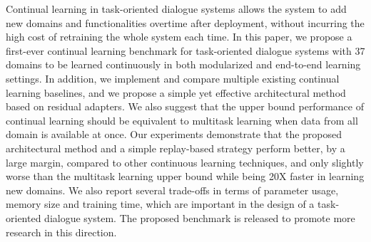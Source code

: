 Continual learning in task-oriented dialogue systems allows the system to add new domains and functionalities overtime after deployment, without incurring the high cost of retraining the whole system each time. In this paper, we propose a first-ever continual learning benchmark for task-oriented dialogue systems with 37 domains to be learned continuously in both modularized and end-to-end learning settings.  In addition, we implement and compare multiple existing continual learning baselines, and we propose a simple yet effective architectural method based on residual adapters. We also suggest that the upper bound performance of continual learning should be equivalent to multitask learning when data from all domain is available at once. Our experiments demonstrate that the proposed architectural method and a simple replay-based strategy perform better, by a large margin, compared to other continuous learning techniques, and only slightly worse than the multitask learning upper bound while being 20X faster in learning new domains. We also report several trade-offs in terms of parameter usage, memory size and training time, which are important in the design of a task-oriented dialogue system. The proposed benchmark is released to promote more research in this direction.
